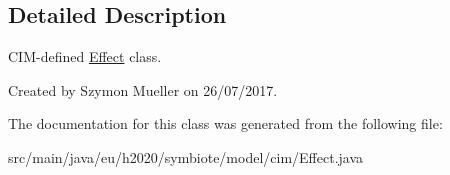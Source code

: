 \subsection{Detailed Description}
C\+I\+M-\/defined \hyperlink{classeu_1_1h2020_1_1symbiote_1_1model_1_1cim_1_1Effect}{Effect} class.

Created by Szymon Mueller on 26/07/2017. 

The documentation for this class was generated from the following file\+:\begin{DoxyCompactItemize}
\item 
src/main/java/eu/h2020/symbiote/model/cim/Effect.\+java\end{DoxyCompactItemize}
